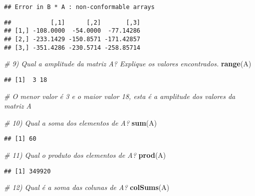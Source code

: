 \documentclass[]{article}
\newenvironment{Shaded}{\begin{snugshade}}{\end{snugshade}}
\newcommand{\CommentTok}[1]{\textcolor[rgb]{0.56,0.35,0.01}{\textit{#1}}}
\newcommand{\KeywordTok}[1]{\textcolor[rgb]{0.13,0.29,0.53}{\textbf{#1}}}
\newcommand{\NormalTok}[1]{#1}
\newcommand{\OperatorTok}[1]{\textcolor[rgb]{0.81,0.36,0.00}{\textbf{#1}}}
\begin{document}
\begin{verbatim}
## Error in B * A : non-conformable arrays
\end{verbatim}

\begin{Shaded}
\end{Shaded}

\begin{verbatim}
##           [,1]      [,2]       [,3]
## [1,] -108.0000  -54.0000  -77.14286
## [2,] -233.1429 -150.8571 -171.42857
## [3,] -351.4286 -230.5714 -258.85714
\end{verbatim}

\begin{Shaded}
\begin{Highlighting}[]
\CommentTok{# 9) Qual a amplitude da matriz A? Explique os valores encontrados.}
\KeywordTok{range}\NormalTok{(A)}
\end{Highlighting}
\end{Shaded}

\begin{verbatim}
## [1]  3 18
\end{verbatim}

\begin{Shaded}
\begin{Highlighting}[]
  \CommentTok{# O menor valor é 3 e o maior valor 18, esta é a amplitude dos valores da matriz A}

\CommentTok{# 10) Qual a soma dos elementos de A?}
\KeywordTok{sum}\NormalTok{(A)}
\end{Highlighting}
\end{Shaded}

\begin{verbatim}
## [1] 60
\end{verbatim}

\begin{Shaded}
\begin{Highlighting}[]
\CommentTok{# 11) Qual o produto dos elementos de A?}
\KeywordTok{prod}\NormalTok{(A)}
\end{Highlighting}
\end{Shaded}

\begin{verbatim}
## [1] 349920
\end{verbatim}

\begin{Shaded}
\begin{Highlighting}[]
\CommentTok{# 12) Qual é a soma das colunas de A?}
\KeywordTok{colSums}\NormalTok{(A)}
\end{Highlighting}
\end{Shaded}
\end{document}
